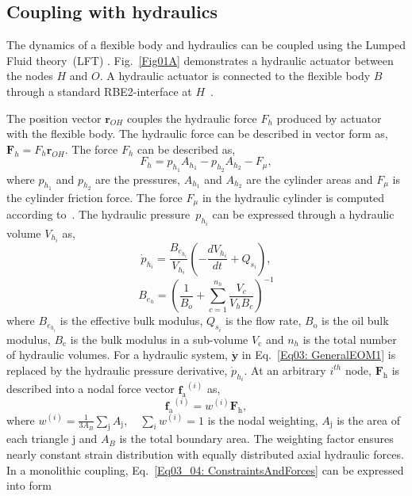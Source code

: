 \subsection{Coupling with hydraulics}
The dynamics of a flexible body and hydraulics can be coupled using the Lumped Fluid theory~(LFT) \cite{khadim2025real,watton2009fundamentals}. Fig.~\ref{Fig01A} demonstrates a hydraulic actuator between the nodes $H$ and $O$. A hydraulic actuator is connected to the flexible body $B$ through a standard RBE2-interface at $H$~\cite{khadim2025real}. 

The position vector $\mathbf{r}_{OH}$ couples the hydraulic force $F_h$ produced by actuator with the flexible body. The hydraulic force can be described in vector form as, 
${\mathbf{F}_h} =F_h \mathbf{r}_{OH}$. The force ${F}_{h}$ can be described as,
\begin{equation} \label{Hydraulicforce}
{F}_{h}  =  p_{h_1}A_{h_1} - p_{h_2}A_{h_2} -F_{\mu},
\end{equation}
where $p_{h_1}$ and $p_{h_2}$ are the pressures, $A_{h_1}$ and $A_{h_2}$ are the cylinder areas and $F_{\mu}$ is the cylinder friction force. The force $F_{\mu}$ in the hydraulic cylinder is computed according to~\cite{brown2016continuous}. The hydraulic pressure~$p_{h_i}$ can be expressed through a hydraulic volume ${V_{h_i}}$ as,
\begin{equation} \label{DiffPressure}
\dot{p}_{h_i}  = \frac{B_{e_{h_i}}}{V_{h_i}}  \left(- \frac{d {V_{h_i}}}{dt} + Q_{s_i}  \right), 
\end{equation}
\begin{equation} \label{EffectBulk}
    B_{e_{h}} = \left(\frac{1}{B_{o}} + \sum_{c=1}^{n_{h}} \frac{V_{c}}{{V_{h}}{B_{c}}} \right)^{-1}
\end{equation}
where $B_{e_{h_i}}$ is the effective bulk modulus, $Q_{s_i}$ is the flow rate, $B_{\mathrm{o}}$ is the oil bulk modulus, $B_{\mathrm{c}}$ is the bulk modulus in a sub-volume  $V_{\mathrm{c}}$ and ${n_{h}}$ is the total number of hydraulic volumes. For a hydraulic system, $\dot{\mathbf{y}}$ in Eq.~\eqref{Eq03: GeneralEOM1} is replaced by the hydraulic pressure derivative, $\dot{p}_{h_i}$. At an arbitrary $i^{th}$ node, ${{\mathbf{F}}_{\mathrm{h}}}$ is described into a nodal force vector ${{\mathbf{f}}_{\mathrm{a}}}^{(i)}$ as, 
\begin{equation}\label{Eq04: NodalHydraulicForce}
    {{\mathbf{f}}_{\mathrm{a}}}^{(i)} = {w^{(i)}} {{\mathbf{F}}_{\mathrm{h}}},
\end{equation}
where ${w^{(i)}} = \frac{1}{3A_B} \sum_{\text{j}} A_{\text{j}}, \quad \sum_i {w^{(i)}} = 1$ is the nodal weighting, $A_{\text{j}}$ is the area of each triangle ${\text{j}}$ and $A_B$ is the total boundary area. The weighting factor ensures nearly constant strain distribution with equally distributed axial hydraulic forces. In a monolithic coupling, Eq.~\eqref{Eq03_04: ConstraintsAndForces} can be expressed into form  
